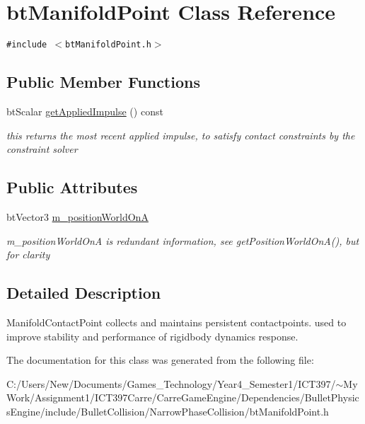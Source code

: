 \hypertarget{classbt_manifold_point}{
\section{btManifoldPoint Class Reference}
\label{classbt_manifold_point}
}
{\tt \#include $<$btManifoldPoint.h$>$}

\subsection*{Public Member Functions}
\begin{CompactItemize}
\item 
\hypertarget{classbt_manifold_point_2506e3d421b66b430db8e8dbf5ad8d1e}{
btScalar \hyperlink{classbt_manifold_point_2506e3d421b66b430db8e8dbf5ad8d1e}{getAppliedImpulse} () const }
\label{classbt_manifold_point_2506e3d421b66b430db8e8dbf5ad8d1e}

\begin{CompactList}\small\item\em this returns the most recent applied impulse, to satisfy contact constraints by the constraint solver \item\end{CompactList}\end{CompactItemize}
\subsection*{Public Attributes}
\begin{CompactItemize}
\item 
\hypertarget{classbt_manifold_point_5fd89785a2e081dd658b15af8bedf04b}{
btVector3 \hyperlink{classbt_manifold_point_5fd89785a2e081dd658b15af8bedf04b}{m\_\-positionWorldOnA}}
\label{classbt_manifold_point_5fd89785a2e081dd658b15af8bedf04b}

\begin{CompactList}\small\item\em m\_\-positionWorldOnA is redundant information, see getPositionWorldOnA(), but for clarity \item\end{CompactList}\end{CompactItemize}


\subsection{Detailed Description}
ManifoldContactPoint collects and maintains persistent contactpoints. used to improve stability and performance of rigidbody dynamics response. 

The documentation for this class was generated from the following file:\begin{CompactItemize}
\item 
C:/Users/New/Documents/Games\_\-Technology/Year4\_\-Semester1/ICT397/$\sim$My Work/Assignment1/ICT397Carre/CarreGameEngine/Dependencies/BulletPhysicsEngine/include/BulletCollision/NarrowPhaseCollision/btManifoldPoint.h\end{CompactItemize}
